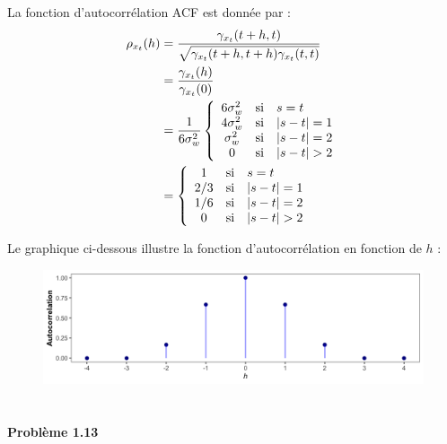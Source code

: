 \documentclass{homework}
\begin{document}
La fonction d'autocorrélation ACF est donnée par :
\begin{align*}
\rho_{x_t}(h) &= \frac{\gamma_{x_t}(t+h,t)}{\sqrt{\gamma_{x_t}(t+h,t+h)\gamma_{x_t}(t,t)}} \\
        &= \frac{\gamma_{x_t}(h)}{\gamma_{x_t}(0)} \\
        &= \frac{1}{6\sigma_w^2} \left\{ 
\begin{array}{c c l}
6\sigma_w^2 & \text{si} & s=t\\
4\sigma_w^2 & \text{si} & \vert s-t \vert = 1\\
\sigma_w^2  & \text{si} & \vert s-t \vert = 2\\
0           & \text{si} & \vert s-t \vert > 2\\
\end{array}
\right.\\
        &= \left\{
             \begin{array}{c c l}
               1   & \text{si} & s=t\\
               2/3 & \text{si} & \vert s-t \vert = 1\\
               1/6 & \text{si} & \vert s-t \vert = 2\\
               0   & \text{si} & \vert s-t \vert > 2\\
             \end{array}
           \right.
\end{align*}

Le graphique ci-dessous illustre la fonction d'autocorrélation en fonction de $h$ : 
\begin{figure}[h]
    \centering
    \includegraphics[width=1\linewidth]{figure1.7.png}
\end{figure}
\newpage
\empty
\section*{}
\newpage
\textbf{\Large{Problème 1.13}}
\end{document}
